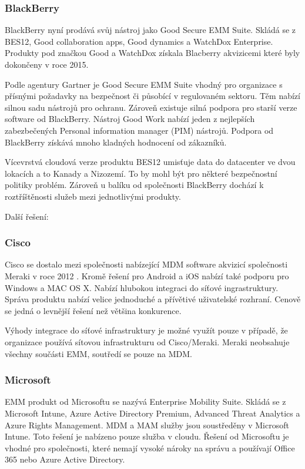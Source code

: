 \subsubsection{BlackBerry}
BlackBerry nyní prodává svůj nástroj jako Good Secure EMM Suite. Skládá se z BES12, Good collaboration apps, Good dynamics a WatchDox Enterprise. Produkty pod značkou Good a WatchDox získala Blacberry akvizicemi které byly dokončeny v roce 2015.  

Podle agentury Gartner je Good Secure EMM Suite vhodný pro organizace s přísnými požadavky na bezpečnost či působící v regulovaném sektoru. Těm nabízí silnou sadu nástrojů pro ochranu. Zároveň existuje silná podpora pro starší verze software od BlackBerry. Nástroj Good Work nabízí jeden z nejlepších zabezbečených Personal information manager (PIM) nástrojů. Podpora od BlackBerry získává mnoho kladných hodnocení od zákazníků. 

Vícevrstvá cloudová verze produktu BES12 umisťuje data do datacenter ve dvou lokacích a to Kanady a Nizozemí. To by mohl být pro některé bezpečnostní politiky problém. Zároveň u balíku od společnosti BlackBerry dochází k roztříštěnosti služeb mezi jednotlivými produkty.


Další řešení:

\subsubsection{Cisco}
Cisco se dostalo mezi společnosti nabízející MDM software akvizicí společnosti Meraki v roce 2012 . Kromě řešení pro Android a iOS nabízí také podporu pro Windows a MAC OS X. Nabízí hlubokou integraci do síťové ingrastruktury. Správa produktu nabízí velice jednoduché a přívětivé uživatelské rozhraní. Cenově se jedná o levnější řešení než většina konkurence.

Výhody integrace do síťové infrastruktury je možné využít pouze v případě, že organizace používá sítovou infrastrukturu od Cisco/Meraki. Meraki neobsahuje všechny součásti EMM, soutředí se pouze na MDM.



\subsubsection{Microsoft}
EMM produkt od Microsoftu se nazývá Enterprise Mobility Suite. Skládá se z Microsoft Intune, Azure Active Directory Premium, Advanced Threat Analytics a Azure Rights Management. MDM a MAM služby jsou soustředěny v Microsoft Intune. Toto řešení je nabízeno pouze služba v cloudu. Řešení od Microsoftu je vhodné pro společnosti, které nemají vysoké nároky na správu a používají Office 365 nebo Azure Active Directory.

